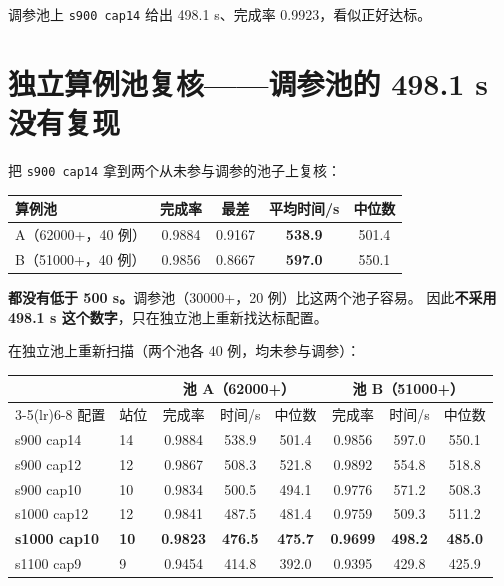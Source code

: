 调参池上 \texttt{s900 cap14} 给出 498.1 s、完成率 0.9923，看似正好达标。

\section{独立算例池复核——调参池的 498.1 s 没有复现}

\begin{warnbox}[title=这是本报告的转折点]
把 \texttt{s900 cap14} 拿到两个从未参与调参的池子上复核：
\begin{center}
\begin{tabular}{lcccc}
\toprule
算例池 & 完成率 & 最差 & 平均时间/s & 中位数 \\ \midrule
A（62000+，40 例） & 0.9884 & 0.9167 & \textbf{538.9} & 501.4 \\
B（51000+，40 例） & 0.9856 & 0.8667 & \textbf{597.0} & 550.1 \\
\bottomrule
\end{tabular}
\end{center}
\textbf{都没有低于 500 s。}调参池（30000+，20 例）比这两个池子容易。
因此\textbf{不采用 498.1 s 这个数字}，只在独立池上重新找达标配置。
\end{warnbox}

在独立池上重新扫描（两个池各 40 例，均未参与调参）：

\begin{center}
\begin{tabular}{llcccccc}
\toprule
 & & \multicolumn{3}{c}{池 A（62000+）} & \multicolumn{3}{c}{池 B（51000+）} \\
\cmidrule(lr){3-5}\cmidrule(lr){6-8}
配置 & 站位 & 完成率 & 时间/s & 中位数 & 完成率 & 时间/s & 中位数 \\ \midrule
s900 cap14 & 14 & 0.9884 & 538.9 & 501.4 & 0.9856 & 597.0 & 550.1 \\
s900 cap12 & 12 & 0.9867 & 508.3 & 521.8 & 0.9892 & 554.8 & 518.8 \\
s900 cap10 & 10 & 0.9834 & 500.5 & 494.1 & 0.9776 & 571.2 & 508.3 \\
s1000 cap12 & 12 & 0.9841 & 487.5 & 481.4 & 0.9759 & 509.3 & 511.2 \\
\textbf{s1000 cap10} & \textbf{10} & \textbf{0.9823} & \textbf{476.5} & \textbf{475.7} & \textbf{0.9699} & \textbf{498.2} & \textbf{485.0} \\
s1100 cap9 & 9 & 0.9454 & 414.8 & 392.0 & 0.9395 & 429.8 & 425.9 \\
\bottomrule
\end{tabular}
\end{center}

